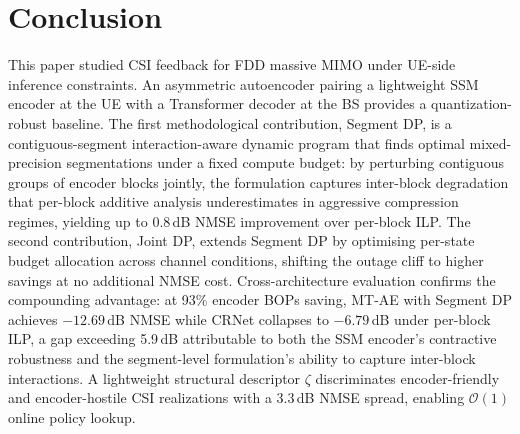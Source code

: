 \documentclass[conference]{IEEEtran}
\begin{document}
\section{Conclusion}
\label{sec:conclusion}
This paper studied CSI feedback for FDD massive MIMO under UE-side inference constraints.
An asymmetric autoencoder pairing a lightweight SSM encoder at the UE with a Transformer decoder at the BS provides a quantization-robust baseline.
The first methodological contribution, Segment DP, is a contiguous-segment interaction-aware dynamic program that finds optimal mixed-precision segmentations under a fixed compute budget: by perturbing contiguous groups of encoder blocks jointly, the formulation captures inter-block degradation that per-block additive analysis underestimates in aggressive compression regimes, yielding up to 0.8\,dB NMSE improvement over per-block ILP.
The second contribution, Joint DP, extends Segment DP by optimising per-state budget allocation across channel conditions, shifting the outage cliff to higher savings at no additional NMSE cost.
Cross-architecture evaluation confirms the compounding advantage: at 93\% encoder BOPs saving, MT-AE with Segment DP achieves $-12.69$\,dB NMSE while CRNet collapses to $-6.79$\,dB under per-block ILP, a gap exceeding 5.9\,dB attributable to both the SSM encoder's contractive robustness and the segment-level formulation's ability to capture inter-block interactions. A lightweight structural descriptor $\zeta$ discriminates encoder-friendly and encoder-hostile CSI realizations with a 3.3\,dB NMSE spread, enabling $\mathcal{O}(1)$ online policy lookup.
\end{document}
